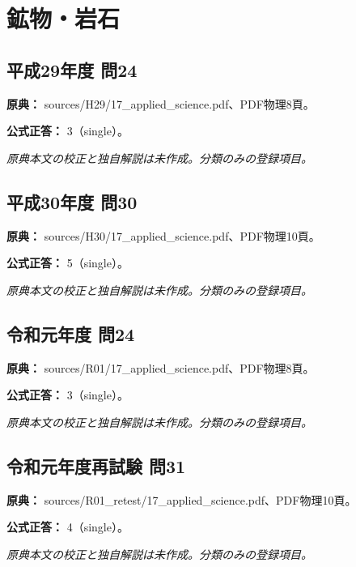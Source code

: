 \section{鉱物・岩石}

\subsection{平成29年度 問24}
\label{q:h29-reg-applied-24}

\noindent\textbf{原典：} sources/H29/17\_applied\_science.pdf、PDF物理8頁。

\textbf{公式正答：} 3（single）。

\par\textit{原典本文の校正と独自解説は未作成。分類のみの登録項目。}

\subsection{平成30年度 問30}
\label{q:h30-reg-applied-30}

\noindent\textbf{原典：} sources/H30/17\_applied\_science.pdf、PDF物理10頁。

\textbf{公式正答：} 5（single）。

\par\textit{原典本文の校正と独自解説は未作成。分類のみの登録項目。}

\subsection{令和元年度 問24}
\label{q:r01-reg-applied-24}

\noindent\textbf{原典：} sources/R01/17\_applied\_science.pdf、PDF物理8頁。

\textbf{公式正答：} 3（single）。

\par\textit{原典本文の校正と独自解説は未作成。分類のみの登録項目。}

\subsection{令和元年度再試験 問31}
\label{q:r01-ret-applied-31}

\noindent\textbf{原典：} sources/R01\_retest/17\_applied\_science.pdf、PDF物理10頁。

\textbf{公式正答：} 4（single）。

\par\textit{原典本文の校正と独自解説は未作成。分類のみの登録項目。}

